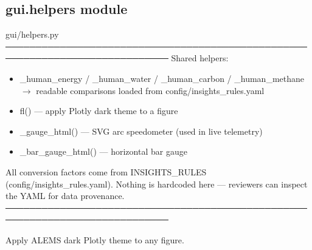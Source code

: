 \documentclass[letterpaper,10pt,english]{sphinxmanual}
\begin{document}
\subsection{gui.helpers module}
\label{\detokenize{gui.helpers:module-gui.helpers}}\label{\detokenize{gui.helpers:gui-helpers-module}}\label{\detokenize{gui.helpers::doc}}
\sphinxAtStartPar
gui/helpers.py
─────────────────────────────────────────────────────────────────────────────
Shared helpers:
\begin{itemize}
\item {} 
\sphinxAtStartPar
\_human\_energy / \_human\_water / \_human\_carbon / \_human\_methane
\(\rightarrow\) readable comparisons loaded from config/insights\_rules.yaml

\item {} 
\sphinxAtStartPar
fl()              — apply Plotly dark theme to a figure

\item {} 
\sphinxAtStartPar
\_gauge\_html()     — SVG arc speedometer (used in live telemetry)

\item {} 
\sphinxAtStartPar
\_bar\_gauge\_html() — horizontal bar gauge

\end{itemize}

\sphinxAtStartPar
All conversion factors come from INSIGHTS\_RULES (config/insights\_rules.yaml).
Nothing is hardcoded here — reviewers can inspect the YAML for data provenance.
─────────────────────────────────────────────────────────────────────────────

\begin{fulllineitems}
\label{\detokenize{gui.helpers:gui.helpers.fl}}
\pysigstartsignatures
\pysiglinewithargsret
{}
{\sphinxparamcomma {}}
{}
\pysigstopsignatures
\sphinxAtStartPar
Apply A\sphinxhyphen{}LEMS dark Plotly theme to any figure.

\end{fulllineitems}


\sphinxstepscope
\end{document}
